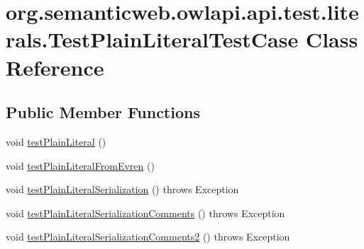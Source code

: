 \hypertarget{classorg_1_1semanticweb_1_1owlapi_1_1api_1_1test_1_1literals_1_1_test_plain_literal_test_case}{\section{org.\-semanticweb.\-owlapi.\-api.\-test.\-literals.\-Test\-Plain\-Literal\-Test\-Case Class Reference}
\label{classorg_1_1semanticweb_1_1owlapi_1_1api_1_1test_1_1literals_1_1_test_plain_literal_test_case}
}
\subsection*{Public Member Functions}
\begin{DoxyCompactItemize}
\item 
void \hyperlink{classorg_1_1semanticweb_1_1owlapi_1_1api_1_1test_1_1literals_1_1_test_plain_literal_test_case_a7c1cbc901fb3949341b5fa1bb80a1269}{test\-Plain\-Literal} ()
\item 
void \hyperlink{classorg_1_1semanticweb_1_1owlapi_1_1api_1_1test_1_1literals_1_1_test_plain_literal_test_case_a7f512f035b9879c43dbc7044901bc19c}{test\-Plain\-Literal\-From\-Evren} ()
\item 
void \hyperlink{classorg_1_1semanticweb_1_1owlapi_1_1api_1_1test_1_1literals_1_1_test_plain_literal_test_case_af20ae558b8fcfd9ef8aa075e7f65311b}{test\-Plain\-Literal\-Serialization} ()  throws Exception 
\item 
void \hyperlink{classorg_1_1semanticweb_1_1owlapi_1_1api_1_1test_1_1literals_1_1_test_plain_literal_test_case_afe5fadcb62f6406ae74f852b7f5774dd}{test\-Plain\-Literal\-Serialization\-Comments} ()  throws Exception 
\item 
void \hyperlink{classorg_1_1semanticweb_1_1owlapi_1_1api_1_1test_1_1literals_1_1_test_plain_literal_test_case_a68a8f14277e1831736de0026abe8923e}{test\-Plain\-Literal\-Serialization\-Comments2} ()  throws Exception 
\end{DoxyCompactItemize}


